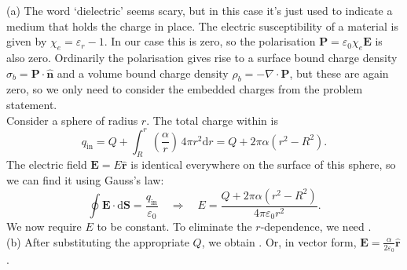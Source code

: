 \documentclass[../TST.tex]{subfiles}
\begin{document}
\ifprob \else
	\begin{solution} (a) The word `dielectric' seems scary, but in this case it's just used to indicate a medium that holds the charge in place. The electric susceptibility of a material is given by $\chi_e=\varepsilon_r-1$. In our case this is zero, so the polarisation $\mathbf{P}=\varepsilon_0\chi_e\mathbf{E}$ is also zero. Ordinarily the polarisation gives rise to a surface bound charge density $\sigma_b=\mathbf{P}\cdot \hat{\mathbf{n}}$ and a volume bound charge density $\rho_b=-\nabla\cdot \mathbf{P}$, but these are again zero, so we only need to consider the embedded charges from the problem statement.\\[5pt]
	Consider a sphere of radius $r$. The total charge within is 
	\begin{equation*}
	q_\mathrm{in}=Q+\int_R^r \left(\frac{\alpha}{r}\right)\,4\pi r^2 \mathrm{d}r=Q+2\pi\alpha(r^2-R^2).
	\end{equation*}
The electric field $\mathbf{E}=E \hat{\mathbf{r}}$ is identical everywhere on the surface of this sphere, so we can find it using Gauss's law:
\begin{equation*}
\oint \mathbf{E}\cdot \mathrm{d}\mathbf{S} = \frac{q_\mathrm{in}}{\varepsilon_0} \quad\Rightarrow\quad E=\frac{Q+2\pi\alpha(r^2-R^2)}{4\pi\varepsilon_0 r^2}.
\end{equation*}
We now require $E$ to be constant. To eliminate the $r$-dependence, we need .\\

(b) After substituting the appropriate $Q$, we obtain . Or, in vector form, $\mathbf{E}=\frac{\alpha}{2\varepsilon_0}\hat{\mathbf{r}}$.\\


\end{solution}
\end{document}
